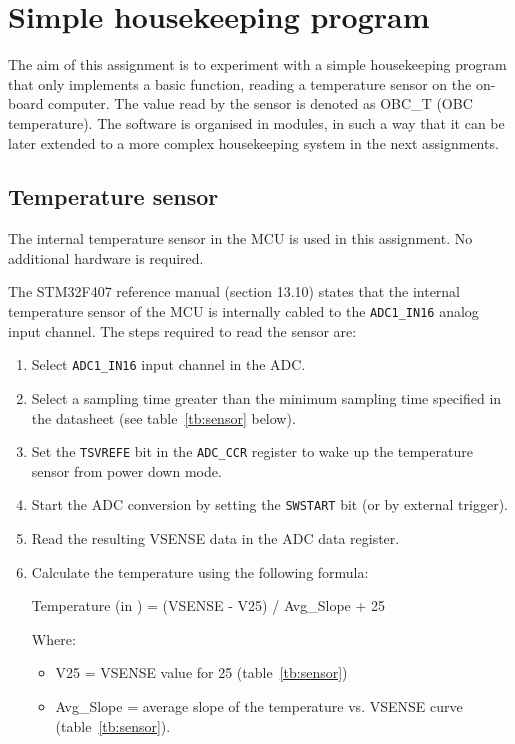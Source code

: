 \chapter{Simple housekeeping program}\label{ch:Assignment3}

The aim of this assignment is to experiment with a simple housekeeping program that only implements a basic function, reading a temperature sensor on the on-board computer. The value read by the sensor is denoted as OBC\_T (OBC temperature).
The software is organised in modules, in such a way that it can be later extended to a more complex housekeeping system in the next assignments.

\section{Temperature sensor}

The internal temperature sensor in the MCU is used in this assignment. No additional hardware is required.

The STM32F407 reference manual (section 13.10) states that the internal temperature sensor of the MCU is internally cabled to the {\tt ADC1\_IN16} analog input channel. The steps required to read the sensor are:

\begin{enumerate}
\item Select {\tt ADC1\_IN16} input channel in the ADC.
\item Select a sampling time greater than the minimum sampling time specified in the datasheet (see table~\ref{tb:sensor} below).
\item Set the {\tt TSVREFE} bit in the {\tt ADC\_CCR} register to wake up the temperature sensor from power down mode.
\item Start the ADC conversion by setting the {\tt SWSTART} bit (or by external trigger).
\item Read the resulting VSENSE data in the ADC data register.
\item Calculate the temperature using the following formula:

Temperature (in ) = {(VSENSE - V25) / Avg\_Slope} + 25

Where:
\begin{itemize}
\item V25 = VSENSE value for 25  (table~\ref{tb:sensor})
\item Avg\_Slope = average slope of the temperature vs. VSENSE curve (table~\ref{tb:sensor}).
\end{itemize}
\end{enumerate}

